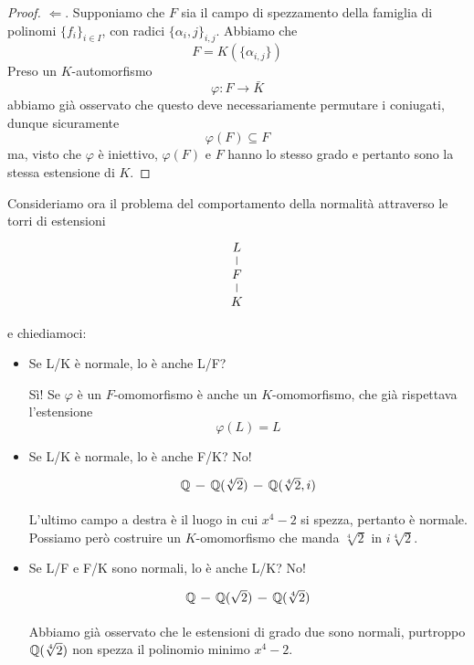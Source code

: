 \begin{multicols}{2}
\begin{proof}
	$ \Leftarrow $. Supponiamo che $ F $ sia il campo di spezzamento della famiglia di polinomi $ \{f_i\}_{i \in I} $, con radici $ \{\alpha_i,j\}_{i,j} $. Abbiamo che 
	\[F = K(\{\alpha_{i, j}\})\]
	 Preso un $ K $-automorfismo
	 \[ \varphi \colon F \to \bar{K} \]
	 abbiamo già osservato che questo deve necessariamente permutare i coniugati, dunque sicuramente
	 \[ \varphi(F) \subseteq F \]
	 ma, visto che $ \varphi $ è iniettivo, $ \varphi(F) $ e $ F $ hanno lo stesso grado e pertanto sono la stessa estensione di $ K $.
\end{proof}

 Consideriamo ora il problema del comportamento della normalità attraverso le torri di estensioni
\[\begin{tikzcd}[row sep=0.25cm]
L \arrow [d,-] \\
F \arrow [d,-] \\
K
\end{tikzcd} \]

e chiediamoci:
\begin{itemize}
	\item Se L/K è normale, lo è anche L/F?
	
	Sì! Se $ \varphi $ è un $ F $-omomorfismo è anche un $ K $-omomorfismo, che già rispettava l'estensione $$  \varphi(L)=L  $$
	
	\item Se L/K è normale, lo è anche F/K? No!
	\[\begin{tikzcd}[column sep=0.25cm]
	\Q \arrow [r,-] &
	\Q(\sqrt[4]{2}) \arrow [r,-] &
	\Q(\sqrt[4]{2}, i)
	\end{tikzcd} \]
	
	L'ultimo campo a destra è il luogo in cui $ x^4-2 $ si spezza, pertanto è normale. Possiamo però costruire un $ K $-omomorfismo che manda $ \sqrt[4]{2} $ in $ i\sqrt[4]{2} $.
	
	\item Se L/F e F/K sono normali, lo è anche L/K? No!
	\[\begin{tikzcd}[column sep=0.25cm]
	\Q \arrow [r,-] &
	\Q(\sqrt{2}) \arrow [r,-] &
	\Q(\sqrt[4]{2})
	\end{tikzcd} \]
	
	Abbiamo già osservato che le estensioni di grado due sono normali, purtroppo $ \mathbb{Q}(\sqrt[4]{2}) $ non spezza il polinomio minimo $ x^4-2 $.
\end{itemize}


\end{multicols}

